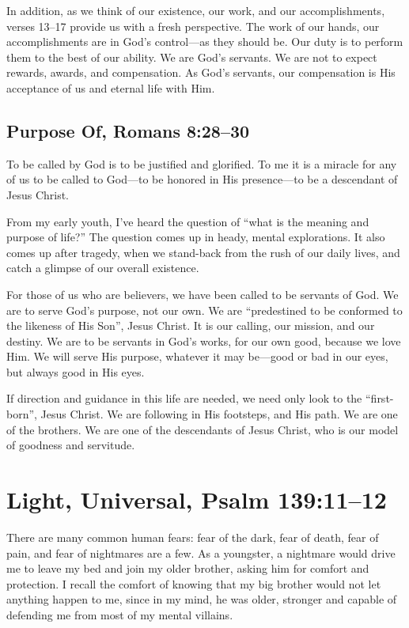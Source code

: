 \documentclass[12pt]{memoir}
\begin{document}
In addition, as we think of our existence, our work, and our accomplishments,
verses 13--17 provide us with a fresh perspective. The work of our
hands, our accomplishments are in God's control---as they should
be. Our duty is to perform them to the best of our ability. We are
God's servants. We are not to expect rewards, awards, and compensation.
As God's servants, our compensation is His acceptance of us and eternal
life with Him. 

\subsection[Purpose of]{Purpose Of, Romans 8:28--30}

To be called by God is to be justified and glorified. To me it is
a miracle for any of us to be called to God---to be honored in His presence---to be a descendant of Jesus Christ.

From my early youth, I've heard the question of ``what is the meaning and purpose of life?'' The question comes up in heady, mental explorations.
It also comes up after tragedy, when we stand-back from the rush of our daily lives, and catch a glimpse of our overall existence. 

For those of us who are believers, we have been called to be servants
of God. We are to serve God's purpose, not our own. We are ``predestined
to be conformed to the likeness of His Son'', Jesus Christ. It is
our calling, our mission, and our destiny. We are to be servants in
God's works, for our own good, because we love Him. We will serve
His purpose, whatever it may be---good or bad in our eyes, but always good in His eyes. 

If direction and guidance in this life are needed, we need only look
to the ``first-born'', Jesus Christ. We are following in His footsteps,
and His path. We are one of the brothers. We are one of the descendants
of Jesus Christ, who is our model of goodness and servitude.

\section[Light, Universal]{Light, Universal, Psalm 139:11--12}

There are many common human fears: fear of the dark, fear of death, fear of pain, and fear of nightmares are a few. As a youngster, a nightmare
would drive me to leave my bed and join my older brother, asking him
for comfort and protection. I recall the comfort of knowing that
my big brother would not let anything happen to me, since in my mind,
he was older, stronger and capable of defending me from most of my
mental villains.
\end{document}
